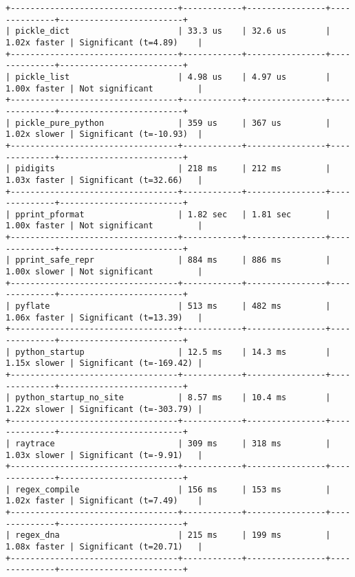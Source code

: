 \begin{code}
\begin{verbatim}
+----------------------------------+------------+----------------+--------------+-------------------------+
| pickle_dict                      | 33.3 us    | 32.6 us        | 1.02x faster | Significant (t=4.89)    |
+----------------------------------+------------+----------------+--------------+-------------------------+
| pickle_list                      | 4.98 us    | 4.97 us        | 1.00x faster | Not significant         |
+----------------------------------+------------+----------------+--------------+-------------------------+
| pickle_pure_python               | 359 us     | 367 us         | 1.02x slower | Significant (t=-10.93)  |
+----------------------------------+------------+----------------+--------------+-------------------------+
| pidigits                         | 218 ms     | 212 ms         | 1.03x faster | Significant (t=32.66)   |
+----------------------------------+------------+----------------+--------------+-------------------------+
| pprint_pformat                   | 1.82 sec   | 1.81 sec       | 1.00x faster | Not significant         |
+----------------------------------+------------+----------------+--------------+-------------------------+
| pprint_safe_repr                 | 884 ms     | 886 ms         | 1.00x slower | Not significant         |
+----------------------------------+------------+----------------+--------------+-------------------------+
| pyflate                          | 513 ms     | 482 ms         | 1.06x faster | Significant (t=13.39)   |
+----------------------------------+------------+----------------+--------------+-------------------------+
| python_startup                   | 12.5 ms    | 14.3 ms        | 1.15x slower | Significant (t=-169.42) |
+----------------------------------+------------+----------------+--------------+-------------------------+
| python_startup_no_site           | 8.57 ms    | 10.4 ms        | 1.22x slower | Significant (t=-303.79) |
+----------------------------------+------------+----------------+--------------+-------------------------+
| raytrace                         | 309 ms     | 318 ms         | 1.03x slower | Significant (t=-9.91)   |
+----------------------------------+------------+----------------+--------------+-------------------------+
| regex_compile                    | 156 ms     | 153 ms         | 1.02x faster | Significant (t=7.49)    |
+----------------------------------+------------+----------------+--------------+-------------------------+
| regex_dna                        | 215 ms     | 199 ms         | 1.08x faster | Significant (t=20.71)   |
+----------------------------------+------------+----------------+--------------+-------------------------+

\end{verbatim}
\end{code}
